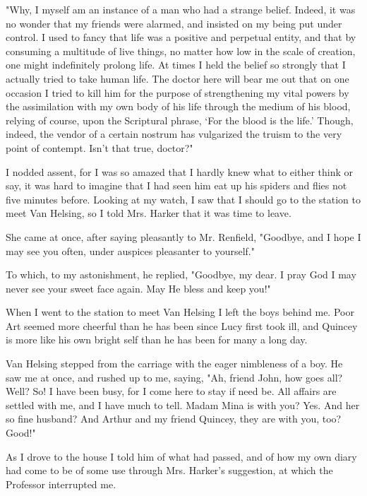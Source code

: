 "Why, I myself am an instance of a man who had a strange belief. Indeed, it was no wonder that my friends were alarmed, and insisted on my being put under control. I used to fancy that life was a positive and perpetual entity, and that by consuming a multitude of live things, no matter how low in the scale of creation, one might indefinitely prolong life. At times I held the belief so strongly that I actually tried to take human life. The doctor here will bear me out that on one occasion I tried to kill him for the purpose of strengthening my vital powers by the assimilation with my own body of his life through the medium of his blood, relying of course, upon the Scriptural phrase, `For the blood is the life.' Though, indeed, the vendor of a certain nostrum has vulgarized the truism to the very point of contempt. Isn't that true, doctor?" 

I nodded assent, for I was so amazed that I hardly knew what to either think or say, it was hard to imagine that I had seen him eat up his spiders and flies not five minutes before. Looking at my watch, I saw that I should go to the station to meet Van Helsing, so I told Mrs. Harker that it was time to leave. 

She came at once, after saying pleasantly to Mr. Renfield, "Goodbye, and I hope I may see you often, under auspices pleasanter to yourself." 

To which, to my astonishment, he replied, "Goodbye, my dear. I pray God I may never see your sweet face again. May He bless and keep you!" 

When I went to the station to meet Van Helsing I left the boys behind me. Poor Art seemed more cheerful than he has been since Lucy first took ill, and Quincey is more like his own bright self than he has been for many a long day. 

Van Helsing stepped from the carriage with the eager nimbleness of a boy. He saw me at once, and rushed up to me, saying, "Ah, friend John, how goes all? Well? So! I have been busy, for I come here to stay if need be. All affairs are settled with me, and I have much to tell. Madam Mina is with you? Yes. And her so fine husband? And Arthur and my friend Quincey, they are with you, too? Good!" 

As I drove to the house I told him of what had passed, and of how my own diary had come to be of some use through Mrs. Harker's suggestion, at which the Professor interrupted me. 

